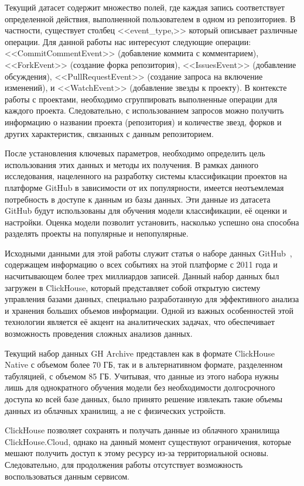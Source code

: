  Текущий датасет содержит множество полей, где каждая запись соответствует определенной действия, выполненной пользователем в одном из репозиториев. В частности, существует столбец <<event\_type,>> который описывает различные операции. Для данной работы нас интересуют следующие операции: <<CommitCommentEvent>> (добавление коммита с комментарием), <<ForkEvent>> (создание форка репозитория), <<IssuesEvent>> (добавление обсуждения), <<PullRequestEvent>> (создание запроса на включение изменений), и <<WatchEvent>> (добавление звезды к проекту). В контексте работы с проектами, необходимо сгруппировать выполненные операции для каждого проекта. Следовательно, с использованием запросов можно получить информацию о названии проекта (репозитория) и количестве звезд, форков и других характеристик, связанных с данным репозиторием.

 После установления ключевых параметров, необходимо определить цель использования этих данных и методы их получения. В рамках данного исследования, нацеленного на разработку системы классификации проектов на платформе GitHub в зависимости от их популярности, имеется неотъемлемая потребность в доступе к данным из базы данных. Эти данные из датасета GitHub будут использованы для обучения модели классификации, её оценки и настройки. Оценка модели позволит установить, насколько успешно она способна разделять проекты на популярные и непопулярные.

Исходными данными для этой работы служит статья о наборе данных GitHub~\cite{clickHouse}, содержащем информацию о всех событиях на этой платформе с 2011 года и насчитывающем более трех миллиардов записей. Данный набор данных был загружен в ClickHouse, который представляет собой открытую систему управления базами данных, специально разработанную для эффективного анализа и хранения больших объемов информации. Одной из важных особенностей этой технологии является её акцент на аналитических задачах, что обеспечивает возможность проведения сложных анализов данных.

Текущий набор данных GH Archive представлен как в формате ClickHouse Native с объемом более 70 ГБ, так и в альтернативном формате, разделенном табуляцией, с объемом 85 ГБ. Учитывая, что данные из этого набора нужны лишь для однократного обучения модели без необходимости долгосрочного доступа ко всей базе данных, было принято решение извлекать такие объемы данных из облачных хранилищ, а не с физических устройств.

ClickHouse позволяет сохранять и получать данные из облачного хранилища ClickHouse.Cloud, однако на данный момент существуют ограничения, которые мешают получить доступ к этому ресурсу из-за территориальной основы. Следовательно, для продолжения работы отсутствует возможность воспользоваться данным сервисом.

